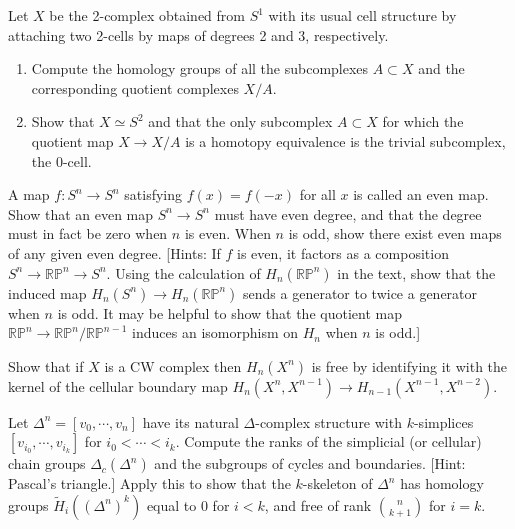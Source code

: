 \begin{exercise}
Let $X$ be the 2-complex obtained from $S^1$ with its usual cell structure by attaching two 2-cells by maps of degrees 2 and 3, respectively.
\begin{enumerate}
\item[(a)] Compute the homology groups of all the subcomplexes $A \subset X$ and the corresponding quotient complexes $X/A$.
\item[(b)] Show that $X \simeq S^2$ and that the only subcomplex $A \subset X$ for which the quotient map $X \to X/A$ is a homotopy equivalence is the trivial subcomplex, the 0-cell.
\end{enumerate}
\end{exercise}

\begin{exercise}
A map $f:S^n \to S^n$ satisfying $f(x) = f(-x)$ for all $x$ is called an even map. Show that an even map $S^n \to S^n$ must have even degree, and that the degree must in fact be zero when $n$ is even. When $n$ is odd, show there exist even maps of any given even degree. [Hints: If $f$ is even, it factors as a composition $S^n \to \mathbb{RP}^n \to S^n$. Using the calculation of $H_n(\mathbb{RP}^n)$ in the text, show that the induced map $H_n(S^n) \to H_n(\mathbb{RP}^n)$ sends a generator to twice a generator when $n$ is odd. It may be helpful to show that the quotient map $\mathbb{RP}^n \to \mathbb{RP}^n/\mathbb{RP}^{n-1}$ induces an isomorphism on $H_n$ when $n$ is odd.]
\end{exercise}

\begin{exercise}
Show that if $X$ is a CW complex then $H_n(X^n)$ is free by identifying it with the kernel of the cellular boundary map $H_n(X^n, X^{n-1}) \to H_{n-1}(X^{n-1}, X^{n-2})$.
\end{exercise}

\begin{exercise}
Let $\Delta^n = [v_0, \cdots, v_n]$ have its natural $\Delta$-complex structure with $k$-simplices $[v_{i_0}, \cdots, v_{i_k}]$ for $i_0 < \cdots < i_k$. Compute the ranks of the simplicial (or cellular) chain groups $\Delta_c(\Delta^n)$ and the subgroups of cycles and boundaries. [Hint: Pascal's triangle.] Apply this to show that the $k$-skeleton of $\Delta^n$ has homology groups $\widetilde{H}_i((\Delta^n)^k)$ equal to $0$ for $i < k$, and free of rank $\binom{n}{k+1}$ for $i = k$.
\end{exercise}

